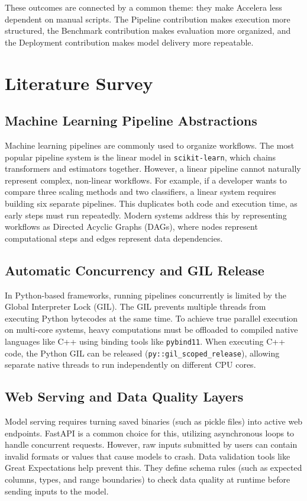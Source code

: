 \documentclass[12pt,a4paper,oneside]{report}
\newcommand{\systemname}{Accelera}
\newcommand{\modulepath}[1]{\texttt{#1}}
\begin{document}
These outcomes are connected by a common theme: they make \systemname{} less dependent on manual scripts. The Pipeline contribution makes execution more structured, the Benchmark contribution makes evaluation more organized, and the Deployment contribution makes model delivery more repeatable.

\chapter{Literature Survey}
\label{chap:literature-survey}

\section{Machine Learning Pipeline Abstractions}
Machine learning pipelines are commonly used to organize workflows. The most popular pipeline system is the linear model in \modulepath{scikit-learn}, which chains transformers and estimators together. However, a linear pipeline cannot naturally represent complex, non-linear workflows. For example, if a developer wants to compare three scaling methods and two classifiers, a linear system requires building six separate pipelines. This duplicates both code and execution time, as early steps must run repeatedly. Modern systems address this by representing workflows as Directed Acyclic Graphs (DAGs), where nodes represent computational steps and edges represent data dependencies.

\section{Automatic Concurrency and GIL Release}
In Python-based frameworks, running pipelines concurrently is limited by the Global Interpreter Lock (GIL). The GIL prevents multiple threads from executing Python bytecodes at the same time. To achieve true parallel execution on multi-core systems, heavy computations must be offloaded to compiled native languages like C++ using binding tools like \modulepath{pybind11}. When executing C++ code, the Python GIL can be released (\modulepath{py::gil\_scoped\_release}), allowing separate native threads to run independently on different CPU cores.

\section{Web Serving and Data Quality Layers}
Model serving requires turning saved binaries (such as pickle files) into active web endpoints. FastAPI is a common choice for this, utilizing asynchronous loops to handle concurrent requests. However, raw inputs submitted by users can contain invalid formats or values that cause models to crash. Data validation tools like Great Expectations help prevent this. They define schema rules (such as expected columns, types, and range boundaries) to check data quality at runtime before sending inputs to the model.
\end{document}
